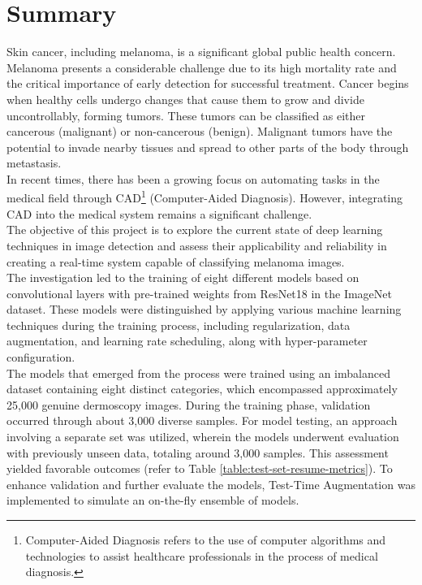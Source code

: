 \chapter*{Summary}

Skin cancer, including melanoma, is a significant global public health concern.
Melanoma presents a considerable challenge due to its high mortality rate and
the critical importance of early detection for successful treatment. Cancer
begins when healthy cells undergo changes that cause them to grow and divide
uncontrollably, forming tumors. These tumors can be classified as either
cancerous (malignant) or non-cancerous (benign). Malignant tumors have the
potential to invade nearby tissues and spread to other parts of the body
through metastasis. \\

In recent times, there has been a growing focus on automating tasks in the
medical field through  CAD\footnote{Computer-Aided Diagnosis refers to the use
of computer algorithms and technologies to assist healthcare professionals in
the process of medical diagnosis.} (Computer-Aided Diagnosis). However,
integrating CAD into the medical system remains a significant challenge. \\

The objective of this project is to explore the current state of deep learning
techniques in image detection and assess their applicability and reliability in
creating a real-time system capable of classifying melanoma images. \\

The investigation led to the training of eight different models based on
convolutional layers with pre-trained weights from ResNet18 in the ImageNet
dataset. These models were distinguished by applying various machine learning
techniques during the training process, including regularization, data
augmentation, and learning rate scheduling, along with hyper-parameter
configuration. \\

The models that emerged from the process were trained using an imbalanced
dataset containing eight distinct categories, which encompassed approximately
25,000 genuine dermoscopy images. During the training phase, validation
occurred through about 3,000 diverse samples. For model testing, an approach
involving a separate set was utilized, wherein the models underwent evaluation
with previously unseen data, totaling around 3,000 samples. This assessment
yielded favorable outcomes (refer to Table
\ref{table:test-set-resume-metrics}). To enhance validation and further
evaluate the models, Test-Time Augmentation was implemented to simulate an
on-the-fly ensemble of models. \\

